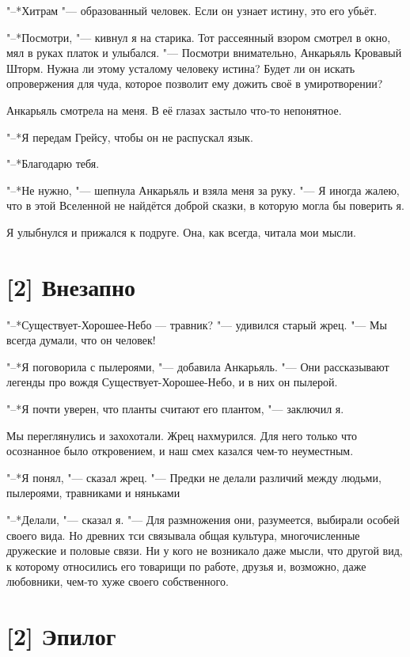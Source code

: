"--*Хитрам "--- образованный человек.
Если он узнает истину, это его убьёт.

"--*Посмотри, "--- кивнул я на старика.
Тот рассеянный взором смотрел в окно, мял в руках платок и улыбался.
"--- Посмотри внимательно, Анкарьяль Кровавый Шторм.
Нужна ли этому усталому человеку истина?
Будет ли он искать опровержения для чуда, которое позволит ему дожить своё в умиротворении?

Анкарьяль смотрела на меня.
В её глазах застыло что-то непонятное.

"--*Я передам Грейсу, чтобы он не распускал язык.

"--*Благодарю тебя.

"--*Не нужно, "--- шепнула Анкарьяль и взяла меня за руку.
"--- Я иногда жалею, что в этой Вселенной не найдётся доброй сказки, в которую могла бы поверить я.

Я улыбнулся и прижался к подруге.
Она, как всегда, читала мои мысли.

\section{[2] Внезапно}

"--*Существует-Хорошее-Небо — травник? "--- удивился старый жрец.
"--- Мы всегда думали, что он человек!

"--*Я поговорила с пылероями, "--- добавила Анкарьяль.
"--- Они рассказывают легенды про вождя Существует-Хорошее-Небо, и в них он пылерой.

"--*Я почти уверен, что планты считают его плантом, "--- заключил я.

Мы переглянулись и захохотали.
Жрец нахмурился.
Для него только что осознанное было откровением, и наш смех казался чем-то неуместным.

"--*Я понял, "--- сказал жрец.
"--- Предки не делали различий между людьми, пылероями, травниками и няньками\ldotst

"--*Делали, "--- сказал я.
"--- Для размножения они, разумеется, выбирали особей своего вида.
Но древних тси связывала общая культура, многочисленные дружеские и половые связи.
Ни у кого не возникало даже мысли, что другой вид, к которому относились его товарищи по работе, друзья и, возможно, даже любовники, чем-то хуже своего собственного.

\section{[2] Эпилог}

